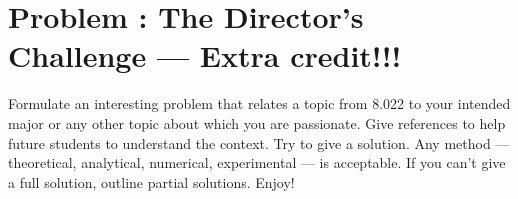 \documentclass[problems]{esg8022pset}
\begin{document}
\section{Problem \thesection: The Director's Challenge --- Extra credit!!!}
  Formulate an interesting problem that relates a topic from 8.022 to your
  intended major or any other topic about which you are passionate.  Give references
  to help future students to understand the context.  Try to give a solution.
  Any method --- theoretical, analytical, numerical, experimental --- is acceptable.
  If you can't give a full solution, outline partial solutions. Enjoy!
\end{document}
